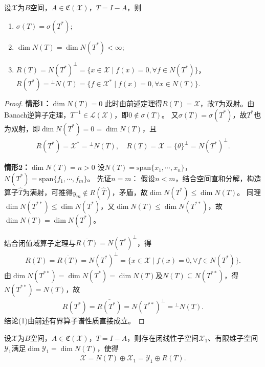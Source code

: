 \documentclass[../../main.tex]{subfiles}%
\begin{document}
\begin{theorem}\label{theorem:泛函分析--Riesz-Fredholm定理}
设$\mathscr{X}$为$B$空间，$A\in\mathfrak{C}(\mathscr{X})$，$T=I-A$，则
\begin{enumerate}[(1)]
\item $\sigma(T)=\sigma(T^*)$;
\item $\dim N(T)=\dim N(T^*)<\infty$;
\item $R(T)=N(T^*)^\perp=\{x\in\mathscr{X}\mid f(x)=0,\forall f\in N(T^*)\}$，\quad $R(T^*)={}^\perp N(T)=\{f\in\mathscr{X}^*\mid f(x)=0,\forall x\in N(T)\}$.
\end{enumerate}
\end{theorem}
\begin{proof}
\textbf{情形1：$\dim N(T)=0$}
此时由前述定理得$R(T)=\mathscr{X}$，故$T$为双射。由Banach逆算子定理，$T^{-1}\in\mathscr{L}(\mathscr{X})$，即$0\notin\sigma(T)$。
又$\sigma(T)=\sigma(T^*)$，故$T^*$也为双射，即$\dim N(T^*)=0=\dim N(T)$，且
\begin{align*}
R(T^*)=\mathscr{X}^*={}^\perp N(T),\quad R(T)=\mathscr{X}=\{\theta\}^\perp=N(T^*)^\perp.
\end{align*}

\textbf{情形2：$\dim N(T)=n>0$}
设$N(T)=\mathrm{span}\{x_1,\cdots,x_n\}$，$N(T^*)=\mathrm{span}\{f_1,\cdots,f_m\}$。
先证$n=m$：
假设$n<m$，结合空间直和分解，构造算子$\widehat{T}$为满射，可推得$y_m\notin R(\widehat{T})$，矛盾，故$\dim N(T^*)\leqslant\dim N(T)$。
同理$\dim N(T^{**})\leqslant\dim N(T^*)$，又$\dim N(T)\leqslant\dim N(T^{**})$，故$\dim N(T)=\dim N(T^*)$。

结合闭值域算子定理与$\overline{R(T)}=N(T^*)^\perp$，得
\begin{align*}
R(T)=\overline{R(T)}=N(T^*)^\perp=\{x\in\mathscr{X}\mid f(x)=0,\forall f\in N(T^*)\}.
\end{align*}
由$\dim N(T^{**})=\dim N(T^*)=\dim N(T)$及$N(T)\subseteq N(T^{**})$，得$N(T^{**})=N(T)$，故
\begin{align*}
R(T^*)=\overline{R(T^*)}=N(T^{**})^\perp={}^\perp N(T).
\end{align*}
结论(1)由前述有界算子谱性质直接成立。
\end{proof}

\begin{theorem}
设$\mathscr{X}$为$B$空间，$A\in\mathfrak{C}(\mathscr{X})$，$T=I-A$，则存在闭线性子空间$\mathscr{X}_1$、有限维子空间$\mathscr{Y}_1$满足$\dim\mathscr{Y}_1=\dim N(T)$，使得
\begin{align*}
\mathscr{X}=N(T)\oplus\mathscr{X}_1=\mathscr{Y}_1\oplus R(T).
\end{align*}
\end{theorem}
\end{document}
